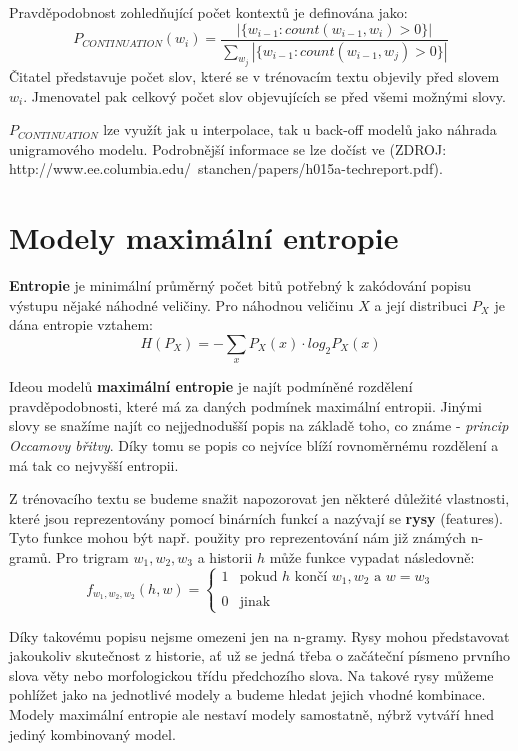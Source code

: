 \documentclass[12pt,a4paper]{report}
\begin{document}
Pravděpodobnost zohledňující počet kontextů je definována jako:
\begin{equation}
P_{CONTINUATION}(w_i) = \frac{|\{w_{i-1} : count(w_{i-1}, w_i) > 0 \}|}{\sum_{w_j} |\{w_{i-1} : count(w_{i-1}, w_j) > 0 \}|}
\end{equation}
Čitatel představuje počet slov, které se v trénovacím textu objevily před slovem $w_i$. Jmenovatel pak celkový počet slov objevujících se před všemi možnými slovy.

$P_{CONTINUATION}$ lze využít jak u interpolace, tak u back-off modelů jako náhrada unigramového modelu. Podrobnější informace se lze dočíst ve (ZDROJ: http://www.ee.columbia.edu/~stanchen/papers/h015a-techreport.pdf).

\section{Modely maximální entropie}

\textbf{Entropie} je minimální průměrný počet bitů potřebný k zakódování popisu výstupu nějaké náhodné veličiny. Pro náhodnou veličinu $X$ a její distribuci $P_X$ je dána entropie vztahem:
\begin{equation}\label{eq:entropy}
H(P_X) = - \sum_x P_X(x) \cdot log_2 P_X(x)
\end{equation}

Ideou modelů \textbf{maximální entropie} je najít podmíněné rozdělení pravděpodobnosti, které má za daných podmínek maximální entropii. Jinými slovy se snažíme najít co nejjednodušší popis na základě toho, co známe - \textit{princip Occamovy břitvy}. Díky tomu se popis co nejvíce blíží rovnoměrnému rozdělení a má tak co nejvyšší entropii.

Z trénovacího textu se budeme snažit napozorovat jen některé důležité vlastnosti, které jsou reprezentovány pomocí binárních funkcí a nazývají se \textbf{rysy} (features). Tyto funkce mohou být např. použity pro reprezentování nám již známých n-gramů. Pro trigram $w_1, w_2, w_3$ a historii $h$ může funkce vypadat následovně:
\begin{equation}
f_{w_1, w_2, w_2}(h,w) = \left\{
\begin{array}{ll}
1 & \text{pokud $h$ končí $w_1, w_2$ a $w = w_3$}\\
\\
0 & \text{jinak}
\end{array}\right.
\end{equation}

Díky takovému popisu nejsme omezeni jen na n-gramy. Rysy mohou představovat jakoukoliv skutečnost z historie, ať už se jedná třeba o začáteční písmeno prvního slova věty nebo morfologickou třídu předchozího slova. Na takové rysy můžeme pohlížet jako na jednotlivé modely a budeme hledat jejich vhodné kombinace. Modely maximální entropie ale nestaví modely samostatně, nýbrž vytváří hned jediný kombinovaný model.
\end{document}
